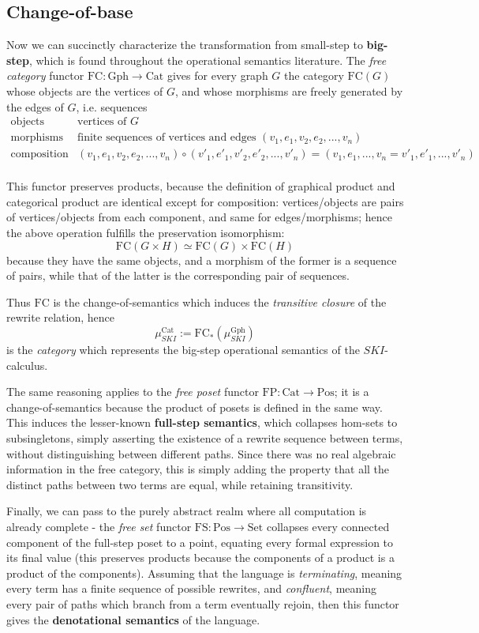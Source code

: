 \documentclass[a4paper,UKenglish]{article}
\theoremstyle{definition}
\newcommand{\Gph}{\mathrm{Gph}}
\newcommand{\Set}{\mathrm{Set}}
\newcommand{\Cat}{\mathrm{Cat}}
\newcommand{\Pos}{\mathrm{Pos}}
\newcommand{\FC}{\mathrm{FC}}
\newcommand{\FP}{\mathrm{FP}}
\newcommand{\FS}{\mathrm{FS}}
\begin{document}
\subsection{Change-of-base}
Now we can succinctly characterize the transformation from small-step to \textbf{big-step}, which is found throughout the operational semantics literature. The \textit{free category} functor $\FC: \Gph \to \Cat$ gives for every graph $G$ the category $\FC(G)$ whose objects are the vertices of $G$, and whose morphisms are freely generated by the edges of $G$, i.e. sequences 
\[\begin{array}{rl}
\text{objects} & \text{vertices of } G\\
\text{morphisms} & \text{finite sequences of vertices and edges } (v_1,e_1,v_2,e_2,...,v_n)\\
\text{composition} & (v_1,e_1,v_2,e_2,...,v_n) \circ (v'_1,e'_1,v'_2,e'_2,...,v'_n) = (v_1,e_1,...,v_n=v'_1,e'_1,...,v'_n)\\
\end{array}\]

This functor preserves products, because the definition of graphical product and categorical product are identical except for composition: vertices/objects are pairs of vertices/objects from each component, and same for edges/morphisms; hence the above operation fulfills the preservation isomorphism: $$\FC(G\times H) \simeq \FC(G)\times \FC(H)$$ because they have the same objects, and a morphism of the former is a sequence of pairs, while that of the latter is the corresponding pair of sequences.

Thus $\FC$ is the change-of-semantics which induces the \textit{transitive closure} of the rewrite relation, hence $$\mu_{SKI}^\Cat := \FC_*(\mu_{SKI}^\Gph)$$ is the \textit{category} which represents the big-step operational semantics of the $SKI$-calculus.

The same reasoning applies to the \textit{free poset} functor $\FP: \Cat \to \Pos$; it is a change-of-semantics because the product of posets is defined in the same way. This induces the lesser-known \textbf{full-step semantics}, which collapses hom-sets to subsingletons, simply asserting the existence of a rewrite sequence between terms, without distinguishing between different paths. Since there was no real algebraic information in the free category, this is simply adding the property that all the distinct paths between two terms are equal, while retaining transitivity.

Finally, we can pass to the purely abstract realm where all computation is already complete - the \textit{free set} functor $\FS: \Pos \to \Set$ collapses every connected component of the full-step poset to a point, equating every formal expression to its final value (this preserves products because the components of a product is a product of the components). Assuming that the language is \textit{terminating}, meaning every term has a finite sequence of possible rewrites, and \textit{confluent}, meaning every pair of paths which branch from a term eventually rejoin, then this functor gives the \textbf{denotational semantics} of the language.
\end{document}
